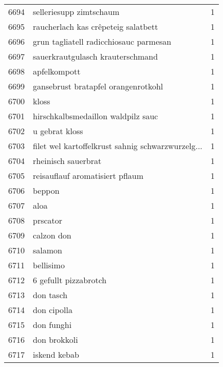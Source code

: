 \begin{tabular}{llr}
6694 &                            selleriesupp zimtschaum &      1 \\
6695 &                raucherlach kas crêpeteig salatbett &      1 \\
6696 &             grun tagliatell radicchiosauc parmesan &      1 \\
6697 &                   sauerkrautgulasch krauterschmand &      1 \\
6698 &                                       apfelkompott &      1 \\
6699 &                gansebrust bratapfel orangenrotkohl &      1 \\
6700 &                                              kloss &      1 \\
6701 &                 hirschkalbsmedaillon waldpilz sauc &      1 \\
6702 &                                     u gebrat kloss &      1 \\
6703 &  filet wel kartoffelkrust sahnig schwarzwurzelg... &      1 \\
6704 &                                rheinisch sauerbrat &      1 \\
6705 &                    reisauflauf aromatisiert pflaum &      1 \\
6706 &                                             beppon &      1 \\
6707 &                                               aloa &      1 \\
6708 &                                           prscator &      1 \\
6709 &                                         calzon don &      1 \\
6710 &                                            salamon &      1 \\
6711 &                                          bellisimo &      1 \\
6712 &                              6 gefullt pizzabrotch &      1 \\
6713 &                                          don tasch &      1 \\
6714 &                                        don cipolla &      1 \\
6715 &                                         don funghi &      1 \\
6716 &                                       don brokkoli &      1 \\
6717 &                                       iskend kebab &      1 \\

\end{tabular}
